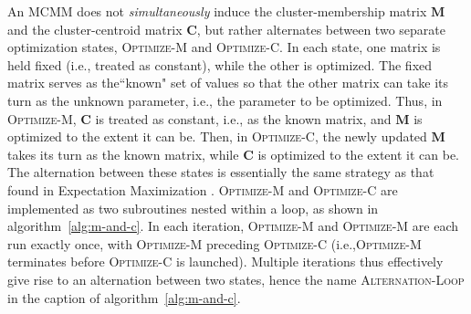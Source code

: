 An MCMM does not \emph{simultaneously} induce the 
cluster-membership matrix $\textbf{M}$ and the cluster-centroid matrix $\textbf{C}$,
but rather 
alternates between two separate optimization states, \textsc{Optimize-M} and \textsc{Optimize-C}. 
In each state, one matrix is held fixed (i.e., treated as constant), 
while the other is optimized. The fixed matrix serves as the``known" set 
of values so that the other matrix can take its turn as the unknown 
parameter, i.e., the parameter to be optimized.
Thus, in \textsc{Optimize-M}, $\textbf{C}$ is treated as constant, i.e., 
as the known matrix, and $\textbf{M}$ is optimized to the extent it can be. 
Then, in \textsc{Optimize-C}, 
the newly updated $\textbf{M}$ takes its turn as the known matrix, 
while $\textbf{C}$ is optimized to the extent it can be. The alternation 
between these states is essentially the same strategy as that found in 
Expectation Maximization \citep{dempster-et-al:1977}.
\textsc{Optimize-M} and \textsc{Optimize-C} are implemented as two subroutines 
nested within a loop, as shown in algorithm~\ref{alg:m-and-c}. %
In each iteration, \textsc{Optimize-M}  and \textsc{Optimize-M} are each run exactly once, 
with \textsc{Optimize-M} preceding \textsc{Optimize-C} (i.e.,\textsc{Optimize-M} 
terminates before \textsc{Optimize-C} is launched). Multiple iterations thus effectively 
give rise to an alternation between two states, hence the name \textsc{Alternation-Loop} in the caption of algorithm~\ref{alg:m-and-c}.

